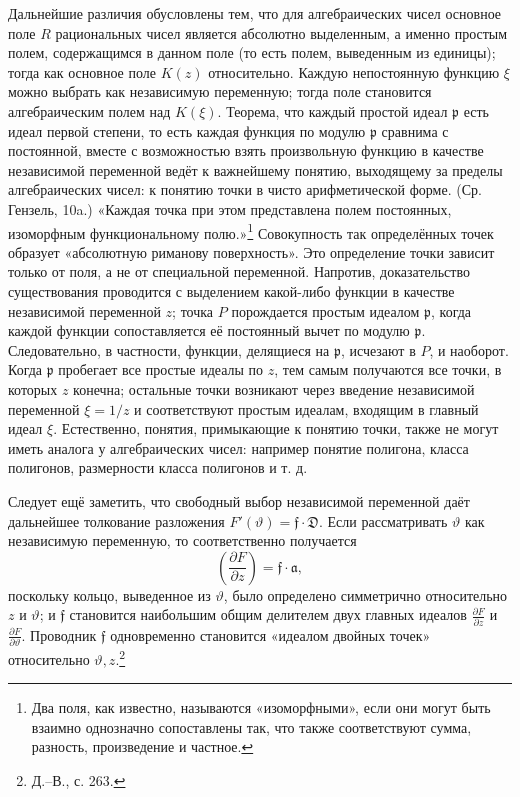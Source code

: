 \documentclass[11pt]{article}
\providecommand{\p}{\partial}
\providecommand{\frD}{\mathfrak D}
\providecommand{\frf}{\mathfrak f}
\providecommand{\fra}{\mathfrak a}
\providecommand{\frp}{\mathfrak p}
\begin{document}
Дальнейшие различия обусловлены тем, что для алгебраических чисел основное поле \(R\) рациональных чисел является абсолютно выделенным, а именно простым полем, содержащимся в данном поле (то есть полем, выведенным из единицы); тогда как основное поле \(K(z)\) относительно. Каждую непостоянную функцию \(\xi\) можно выбрать как независимую переменную; тогда поле становится алгебраическим полем над \(K(\xi)\). Теорема, что каждый простой идеал \(\frp\) есть идеал первой степени, то есть каждая функция по модулю \(\frp\) сравнима с постоянной, вместе с возможностью взять произвольную функцию в качестве независимой переменной ведёт к важнейшему понятию, выходящему за пределы алгебраических чисел: к понятию точки в чисто арифметической форме. (Ср. Гензель, 10a.) «Каждая точка при этом представлена полем постоянных, изоморфным функциональному полю.»\footnote{Два поля, как известно, называются «изоморфными», если они могут быть взаимно однозначно сопоставлены так, что также соответствуют сумма, разность, произведение и частное.} Совокупность так определённых точек образует «абсолютную риманову поверхность». Это определение точки зависит только от поля, а не от специальной переменной. Напротив, доказательство существования проводится с выделением какой-либо функции в качестве независимой переменной \(z\); точка \(P\) порождается простым идеалом \(\frp\), когда каждой функции сопоставляется её постоянный вычет по модулю \(\frp\). Следовательно, в частности, функции, делящиеся на \(\frp\), исчезают в \(P\), и наоборот. Когда \(\frp\) пробегает все простые идеалы по \(z\), тем самым получаются все точки, в которых \(z\) конечна; остальные точки возникают через введение независимой переменной \(\xi=1/z\) и соответствуют простым идеалам, входящим в главный идеал \(\xi\). Естественно, понятия, примыкающие к понятию точки, также не могут иметь аналога у алгебраических чисел: например понятие полигона, класса полигонов, размерности класса полигонов и т. д.

Следует ещё заметить, что свободный выбор независимой переменной даёт дальнейшее толкование разложения \(F'(\vartheta)=\frf\cdot\frD\). Если рассматривать \(\vartheta\) как независимую переменную, то соответственно получается
\[
\left(\frac{\p F}{\p z}\right)=\frf\cdot\fra,
\]
поскольку кольцо, выведенное из \(\vartheta\), было определено симметрично относительно \(z\) и \(\vartheta\); и \(\frf\) становится наибольшим общим делителем двух главных идеалов \(\frac{\p F}{\p z}\) и \(\frac{\p F}{\p\vartheta}\). Проводник \(\frf\) одновременно становится «идеалом двойных точек» относительно \(\vartheta,z\).\footnote{Д.--В., с. 263.}
\end{document}
